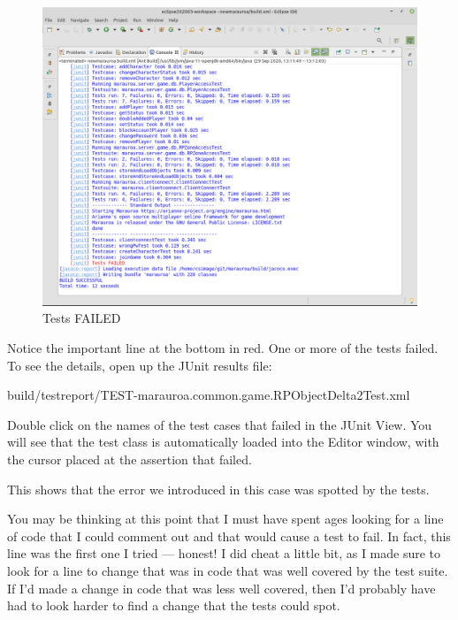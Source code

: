 \documentclass[
]{book}
\newenvironment{Shaded}{\begin{snugshade}}{\end{snugshade}}
\newcommand{\NormalTok}[1]{#1}
\begin{document}
\begin{figure}

{\centering \includegraphics[width=1\linewidth]{images/3.4.2resultsOfRunningTheTestsOnTheModifiedCodeCompleteBuild} 

}

\caption{Tests FAILED}\label{fig:resultsOfRunningTheTestsOnTheModifiedCodeCompleteBuild-fig}
\end{figure}

Notice the important line at the bottom in red. One or more of the tests failed. To see the details, open up the JUnit results file:

\begin{Shaded}
\begin{Highlighting}[]
\NormalTok{build/testreport/TEST{-}marauroa.common.game.RPObjectDelta2Test.xml}
\end{Highlighting}
\end{Shaded}

Double click on the names of the test cases that failed in the JUnit View. You will see that the test class is automatically loaded into the Editor window, with the cursor placed at the assertion that failed.

This shows that the error we introduced in this case was spotted by the tests.

You may be thinking at this point that I must have spent ages looking for a line of code that I could comment out and that would cause a test to fail. In fact, this line was the first one I tried --- honest! I did cheat a little bit, as I made sure to look for a line to change that was in code that was well covered by the test suite. If I'd made a change in code that was less well covered, then I'd probably have had to look harder to find a change that the tests could spot.
\end{document}
